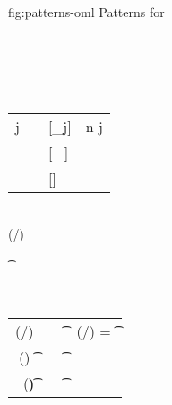 \documentclass[acmsmall,screen,nonacm]{acmart}
\begin{document}
\begin{mathparfig}
  {fig:patterns-oml}
  {Patterns for \OML}
  \begin{bnfgrammar}
    \\
    \entry[Constraints]{\c}{
      \dots
      \and \labenv(\elab/\ct) \leq \tone \to \ttwo
      \and \labenv(\elab/\T) \leq \tone \to \ttwo
      \andcr \cs \leq \t
      \and \ts \leq \t
      \andcr \x \leq \cs
      \and \x \leq \ts
    } \\
  \end{bnfgrammar}
  \\
  \newcommand{\Mrule}[4][]{{#2} \Matches {#3} &\eqdef& {#4} & #1}
  \begin{tabular}{RCLL}
    \Mrule[ n \geq j]
      {\cpatprod \tv j}
      {\shapp[\any \tvcs \Pi\iton \tvcs] \tys}
      {[\tv \is \ty_j]}
    \\[1ex]
    \Mrule
      {\cpatrcd \ct}
      {\shapp[\any \tvcs \tvcs \Tapp] \tys}
      {[\ct \is ~ \T]}
    \\[1ex]
    \Mrule
      {\cpatpoly \cs}
      {\shapp[\any \tvcs \tpoly \ts] \tys}
      {[\cs \is \ts \where{\tvcs \is \tys}]}
  \end{tabular}
  \\
    {\semenv \th \labenv(\elab/\ct) \leq \tone \to \ttwo}

    {\semenv \th \cs \leq \t}

    {\semenv \th \x \leq \cs}
  \\
  \newcommand{\Srule}[3][]{{#2} &\eqdef& {#3} & {#1}}
  \begin{tabular}{RCLL}
    \Srule[ \labenv(\elab/\T) = \tfor \tvs \t \to \tvs \Tapp]
      {\labenv(\elab/\T) \leq \tone \to \ttwo}
      {\cexists \tvs \cunif \tone \t \cand \cunif \ttwo {\tvs \Tapp}}
    \\[1ex]
    \Srule
      {(\tfor \tvs \tp) \leq \t}
      {\cexists \tvs \cunif \tp \t}
    \\[1ex]
    \Srule
      {\x \leq (\tfor \tvs \t)}
      {\cfor \tvs \capp \x \t}
  \end{tabular}

\end{mathparfig}
\end{document}
